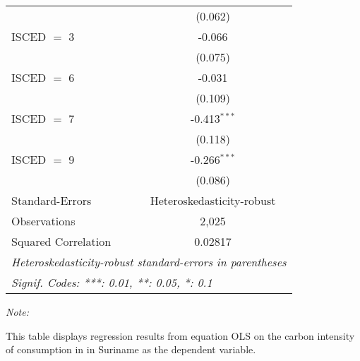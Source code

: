 \begin{table}[htbp!]
\begin{adjustbox}{width = 1\textwidth, max height = 0.95\textheight, center}
\begin{threeparttable}[b]
\begin{tabular}{lc}
                                & (0.062)\\   
            ISCED $=$ 3         & -0.066\\   
                                & (0.075)\\   
            ISCED $=$ 6         & -0.031\\   
                                & (0.109)\\   
            ISCED $=$ 7         & -0.413$^{***}$\\   
                                & (0.118)\\   
            ISCED $=$ 9         & -0.266$^{***}$\\   
                                & (0.086)\\   
            \midrule 
            Standard-Errors     & Heteroskedasticity-robust \\   
            Observations        & 2,025\\  
            Squared Correlation & 0.02817\\  
            \midrule \midrule
            \multicolumn{2}{l}{\emph{Heteroskedasticity-robust standard-errors in parentheses}}\\
            \multicolumn{2}{l}{\emph{Signif. Codes: ***: 0.01, **: 0.05, *: 0.1}}\\
         \end{tabular}
         
         \begin{tablenotes}\item \medskip \textit{Note:}
            \item This table displays regression results from equation OLS on the carbon intensity of consumption in  in Suriname as the dependent variable. 
         \end{tablenotes}
      \end{threeparttable}
   \end{adjustbox}
\end{table}


